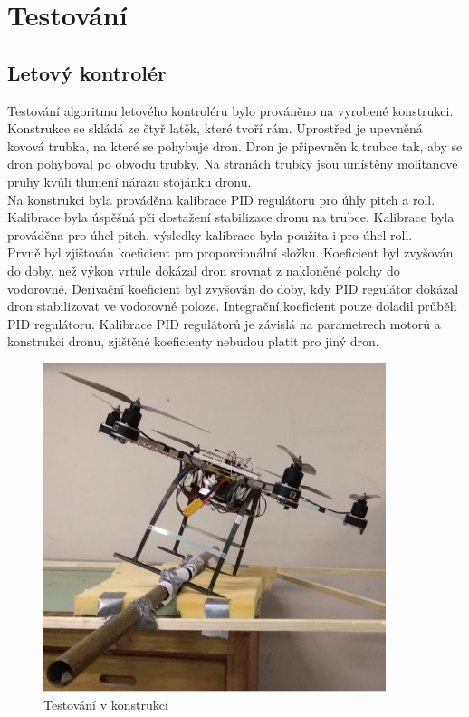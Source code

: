 \chapter{Testování}
\label{6-testovani}

\section{Letový kontrolér}
Testování algoritmu letového kontroléru bylo prováněno na vyrobené konstrukci. Konstrukce se skládá ze čtyř latěk, které tvoří rám. Uprostřed je upevněná kovová trubka, na které se pohybuje dron. Dron je připevněn k trubce tak, aby se dron pohyboval po obvodu trubky. Na stranách trubky jsou umístěny molitanové pruhy kvůli tlumení nárazu stojánku dronu.\\
Na konstrukci byla prováděna kalibrace PID regulátoru pro úhly pitch a roll. Kalibrace byla úspěšná při dostažení stabilizace dronu na trubce. Kalibrace byla prováděna pro úhel pitch, výsledky kalibrace byla použita i pro úhel roll.\\
Prvně byl zjištován koeficient pro proporcionální složku. Koeficient byl zvyšován do doby, než výkon vrtule dokázal dron srovnat z nakloněné polohy do vodorovné. Derivační koeficient byl zvyšován do doby, kdy PID regulátor dokázal dron stabilizovat ve vodorovné poloze. Integrační koeficient pouze doladil průběh PID regulátoru. Kalibrace PID regulátorů je závislá na parametrech motorů a konstrukci dronu, zjištěné koeficienty nebudou platit pro jiný dron.\\

\begin{figure}[H]
	\centering
	\includegraphics[width=10cm]{pictures/pidtest.jpg}
	\caption{Testování v konstrukci}
\end{figure}

